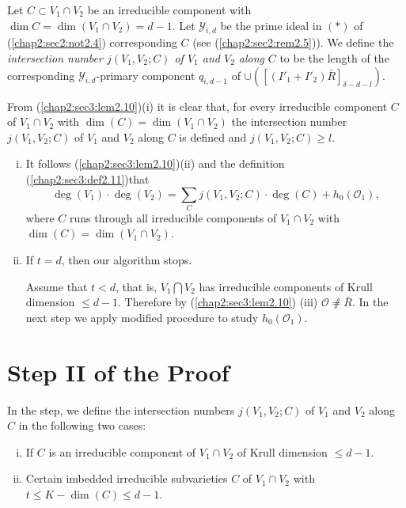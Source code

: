 \setcounter{definition}{10}
\begin{definition}\label{chap2:sec3:def2.11}
  Let $C \subset V_1 \cap V_2$ be an irreducible component with
  $\dim C=\dim (V_1 \cap V_2)=d-1$. Let $\mathscr{Y}_{i, d}$ be the
  prime ideal in $(*)$ of (\ref{chap2:sec2:not2.4}) corresponding $C$
  (see (\ref{chap2:sec2:rem2.5})). We 
  define the \textit{intersection number $j(V_1,V_2;C)$ of $V_1$ and
    $V_2$ along
  } $C$ to be the length of the corresponding $\mathscr{Y}_{i,
    d}$-primary component $q_{i, d-1}$ of $
  \cup([(I'_1 + I'_2)\bar{R}]_{\delta -d -l})$. 
\end{definition}

From (\ref{chap2:sec3:lem2.10})(i) it is clear that, for every
irreducible component $C$ 
of $V_1 \cap V_2$ with $\dim (C)=\dim (V_1 \cap V_2)$ the intersection
number $j(V_1,V_2;C)$ of $V_1$  and $V_2$ along $C$ is defined and
$j(V_1, V_2; C) \geq l$.
  
\setcounter{remarks}{11}
\begin{remarks}\label{chap2:sec3:lem2.12}
  \begin{enumerate}[(i)]
  \item It follows (\ref{chap2:sec3:lem2.10})(ii) and the definition
    (\ref{chap2:sec3:def2.11})\pageoriginale that 
    $$
    \deg (V_1)\cdot\deg (V_2)= \sum\limits_C j(V_1,V_2;C)\cdot\deg
    (C)+h_0(\mathscr{O}_1),
    $$ 
    where $C$ runs through all irreducible
    components of $V_1 \cap V_2$ with $\dim (C) =\dim (V_1 \cap V_2)$. 
  \item If $t=d$, then our algorithm stops.
    
    Assume that $t < d$, that is, $V_1 \bigcap V_2$ has irreducible
    components of Krull dimension $\leq d-1$. Therefore by
    (\ref{chap2:sec3:lem2.10}) (iii)
    $\mathscr{O}\not\neq \bar{R}$. In the next step we apply modified
    procedure to study $h_0(\mathscr{O}_1)$.  
  \end{enumerate}
\end{remarks}

\section{Step II of the Proof}\label{chap2:sec4}

\begin{step}\label{chap2:sec4:step2}
 In the step, we define the intersection numbers $j(V_1, V_2; C)$ of
  $V_1$ and $V_2$ along $C$ in the following two cases:  
 
 \begin{enumerate}[(i)]
\item If $C$ is an irreducible component of $V_1 \cap V_2$ of Krull
  dimension $\leq d-1$. 
\item Certain imbedded irreducible subvarieties $C$ of $V_1 \cap V_2$
  with $t \leq K-\dim (C) \leq d-1$. 
 \end{enumerate}
\end{step}

